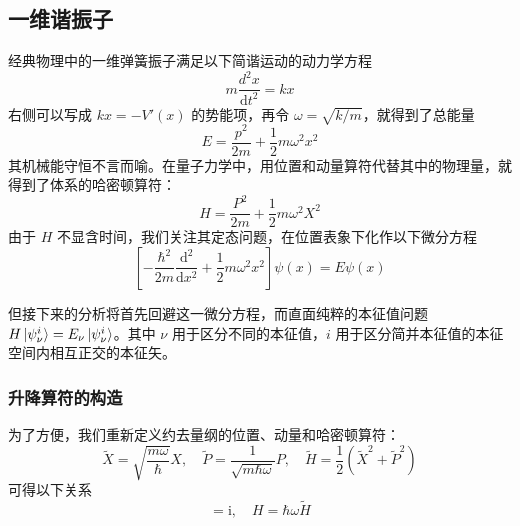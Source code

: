 \documentclass[cn,10pt,math=newtx,citestyle=gb7714-2015,bibstyle=gb7714-2015]{elegantbook}
\def\d{\mathrm d}
\def\i{\mathrm i}
\def\td{\tilde}
\begin{document}
\subsection{一维谐振子}

经典物理中的一维弹簧振子满足以下简谐运动的动力学方程
\begin{equation}
    m\frac{d^2x}{\d t^2}=kx
\end{equation}
右侧可以写成 $kx=-V'(x)$ 的势能项，再令 $\omega=\sqrt{k/m}$，就得到了总能量
\begin{equation}
    E=\frac{p^2}{2m}+\frac 1 2 m\omega^2x^2
\end{equation}
其机械能守恒不言而喻。在量子力学中，用位置和动量算符代替其中的物理量，就得到了体系的哈密顿算符：
\begin{equation}
    H=\frac{P^2}{2m}+\frac 1 2 m\omega^2X^2
\end{equation}
由于 $H$ 不显含时间，我们关注其定态问题，在位置表象下化作以下微分方程
\begin{equation}
    \left[-\frac{\hbar^2}{2m}\frac{\d^2}{\d x^2}+\frac 1 2 m\omega^2 x^2\right]\psi(x)=E\psi(x)
\end{equation}

但接下来的分析将首先回避这一微分方程，而直面纯粹的本征值问题 $H\ket{\psi_\nu^i}=E_\nu\ket{\psi_\nu^i}$。其中 $\nu$ 用于区分不同的本征值，$i$ 用于区分简并本征值的本征空间内相互正交的本征矢。

\subsubsection{升降算符的构造}
为了方便，我们重新定义约去量纲的位置、动量和哈密顿算符：
\begin{equation*}
    \td{X} =\sqrt{\frac{m\omega}{\hbar}}X,\quad \td P = \frac{1}{\sqrt{m\hbar\omega}}P,\quad \td H=\frac 1 2(\td X^2+\td P^2)
\end{equation*}
可得以下关系
\begin{equation*}
    [\td X,\td P] = \i,\quad H=\hbar\omega\td H
\end{equation*}
\end{document}
